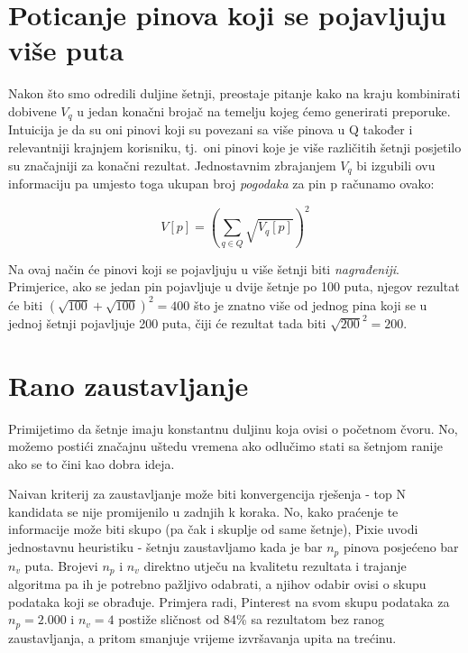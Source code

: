 \documentclass[times, utf8, seminar]{fer}
\begin{document}
\section{Poticanje pinova koji se pojavljuju više puta}
\label{boosting}

Nakon što smo odredili duljine šetnji, preostaje pitanje kako na kraju kombinirati dobivene $V_q$ u jedan konačni brojač na temelju kojeg ćemo generirati preporuke. Intuicija je da su oni pinovi koji su povezani sa više pinova u Q također i relevantniji krajnjem korisniku, tj.\ oni pinovi koje je više različitih šetnji posjetilo su značajniji za konačni rezultat. Jednostavnim zbrajanjem $V_q$ bi izgubili ovu informaciju pa umjesto toga ukupan broj \textit{pogodaka} za pin p računamo ovako:

\begin{centering}
		  $$ V[p] = (\sum_{q \in Q}{\sqrt{V_q[p]}})^2 $$
		  \par
\end{centering}

Na ovaj način će pinovi koji se pojavljuju u više šetnji biti \textit{nagrađeniji}. Primjerice, ako se jedan pin pojavljuje u dvije šetnje po 100 puta, njegov rezultat će biti $ (\sqrt{100} + \sqrt{100})^2 = 400 $ što je znatno više od jednog pina koji se u jednoj šetnji pojavljuje 200 puta, čiji će rezultat tada biti $ \sqrt{200}^2 = 200 $.

\section{Rano zaustavljanje}
\label{early-stop}

Primijetimo da šetnje imaju konstantnu duljinu koja ovisi o početnom čvoru. No, možemo postići značajnu uštedu vremena ako odlučimo stati sa šetnjom ranije ako se to čini kao dobra ideja.

Naivan kriterij za zaustavljanje može biti konvergencija rješenja - top N kandidata se nije promijenilo u zadnjih k koraka. No, kako praćenje te informacije može biti skupo (pa čak i skuplje od same šetnje), Pixie uvodi jednostavnu heuristiku - šetnju zaustavljamo kada je bar $n_p$ pinova posjećeno bar $n_v$ puta. Brojevi $n_p$ i $n_v$ direktno utječu na kvalitetu rezultata i trajanje algoritma pa ih je potrebno pažljivo odabrati, a njihov odabir ovisi o skupu podataka koji se obrađuje. Primjera radi, Pinterest na svom skupu podataka za $n_p=2.000$ i $n_v=4$ postiže sličnost od 84\% sa rezultatom bez ranog zaustavljanja, a pritom smanjuje vrijeme izvršavanja upita na trećinu.
\end{document}
